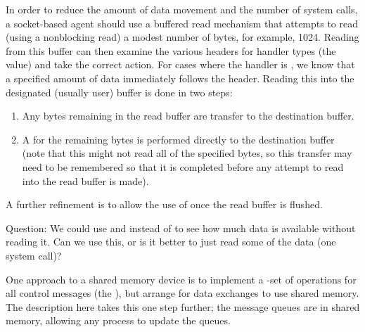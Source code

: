 \begin{mmadi}
\begin{tcp}
In order to reduce the amount of data movement and the number of system calls,
a socket-based agent should use a buffered read mechanism that attempts to
read (using a nonblocking read) a modest number of bytes, for example, 1024.
Reading from this buffer can then examine the various headers for handler
types (the  value) and take the correct action.
For cases where the handler is , we know that a
specified amount of data immediately follows the 
header.  Reading this into the designated (usually user) buffer is done in two
steps: 
\begin{enumerate}
\item Any bytes remaining in the read buffer are transfer to the destination
  buffer. 
\item A  for the remaining bytes is performed directly to the
  destination buffer (note that this might not read all of the specified
  bytes, so this transfer may need to be remembered so that it is completed
  before any attempt to read into the read buffer is made).
\end{enumerate}
A further refinement is to allow the use of  once the read buffer
is flushed.  

Question: We could use  and  instead of 
to see how much data is available without reading it.  Can we use this, or is
it better to just read some of the data (one system call)?
\end{tcp}

\begin{shmem}

One approach to a shared memory device is to implement a \tcpname-set of
operations for all control messages (the ), but
arrange for data exchanges to use shared memory.  The description here takes
this one step further; the message queues are in shared memory, allowing any
process to update the queues.


\end{shmem}
\end{mmadi}
